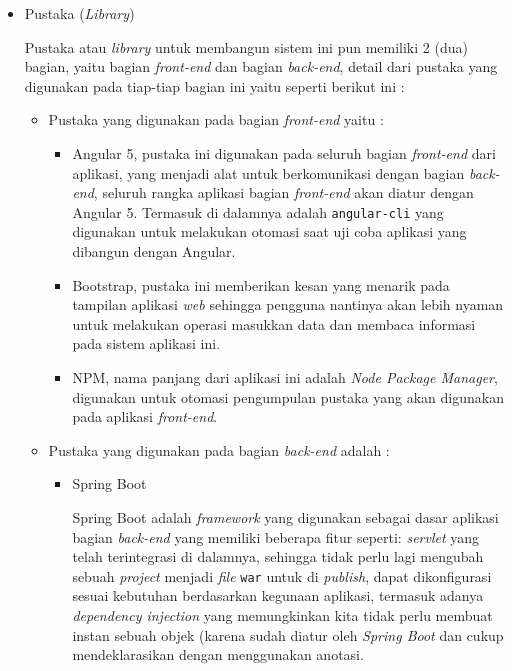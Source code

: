 \documentclass[pdftex,12pt, oneside]{article}
\begin{document}
\begin{itemize}
	\item Pustaka (\textit{Library})
	
Pustaka atau \textit{library} untuk membangun sistem ini pun memiliki 2 (dua) bagian, yaitu bagian \textit{front-end} dan bagian \textit{back-end}, detail dari pustaka yang digunakan pada tiap-tiap bagian ini yaitu seperti berikut ini :

		\begin{itemize}
			\item Pustaka yang digunakan pada bagian \textit{front-end} yaitu :
			
			\begin{itemize}
				\item Angular 5, pustaka ini digunakan pada seluruh bagian \textit{front-end} dari aplikasi, yang menjadi alat untuk berkomunikasi dengan bagian \textit{back-end}, seluruh rangka aplikasi bagian \textit{front-end} akan diatur dengan Angular 5. Termasuk di dalamnya adalah \texttt{angular-cli} yang digunakan untuk melakukan otomasi saat uji coba aplikasi yang dibangun dengan Angular.
				\item Bootstrap, pustaka ini memberikan kesan yang menarik pada tampilan aplikasi \textit{web} sehingga pengguna nantinya akan lebih nyaman untuk melakukan operasi masukkan data dan membaca informasi pada sistem aplikasi ini.
				\item NPM, nama panjang dari aplikasi ini adalah \textit{Node Package Manager}, digunakan untuk otomasi pengumpulan pustaka yang akan digunakan pada aplikasi \textit{front-end}.
			\end{itemize}
			
			\item Pustaka yang digunakan pada bagian \textit{back-end} adalah :
			
			\begin{itemize}
				\item Spring Boot
				
Spring Boot adalah \textit{framework} yang digunakan sebagai dasar aplikasi bagian \textit{back-end} yang memiliki beberapa fitur seperti: \textit{servlet} yang telah terintegrasi di dalamnya, sehingga tidak perlu lagi mengubah sebuah \textit{project} menjadi \textit{file} \texttt{war} untuk di \textit{publish}, dapat dikonfigurasi sesuai kebutuhan berdasarkan kegunaan aplikasi, termasuk adanya \textit{dependency injection} yang memungkinkan kita tidak perlu membuat instan sebuah objek (karena sudah diatur oleh \textit{Spring Boot} dan cukup mendeklarasikan dengan menggunakan anotasi.				
				

\end{itemize}
\end{itemize}
\end{itemize}
\end{document}
